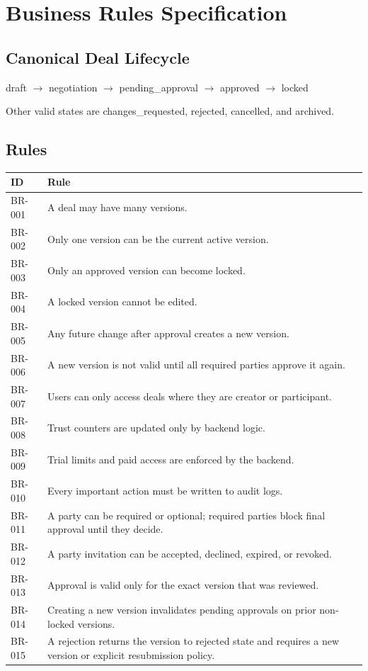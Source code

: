 \chapter{Business Rules Specification}
\section{Canonical Deal Lifecycle}
\begin{center}
draft $\rightarrow$ negotiation $\rightarrow$ pending\_approval $\rightarrow$ approved $\rightarrow$ locked
\end{center}
Other valid states are changes\_requested, rejected, cancelled, and archived.
\section{Rules}
\begin{longtable}{p{}p{}}
\toprule
ID & Rule \\
\midrule
BR-001 & A deal may have many versions. \\
BR-002 & Only one version can be the current active version. \\
BR-003 & Only an approved version can become locked. \\
BR-004 & A locked version cannot be edited. \\
BR-005 & Any future change after approval creates a new version. \\
BR-006 & A new version is not valid until all required parties approve it again. \\
BR-007 & Users can only access deals where they are creator or participant. \\
BR-008 & Trust counters are updated only by backend logic. \\
BR-009 & Trial limits and paid access are enforced by the backend. \\
BR-010 & Every important action must be written to audit logs. \\
BR-011 & A party can be required or optional; required parties block final approval until they decide. \\
BR-012 & A party invitation can be accepted, declined, expired, or revoked. \\
BR-013 & Approval is valid only for the exact version that was reviewed. \\
BR-014 & Creating a new version invalidates pending approvals on prior non-locked versions. \\
BR-015 & A rejection returns the version to rejected state and requires a new version or explicit resubmission policy. \\

\end{longtable}
